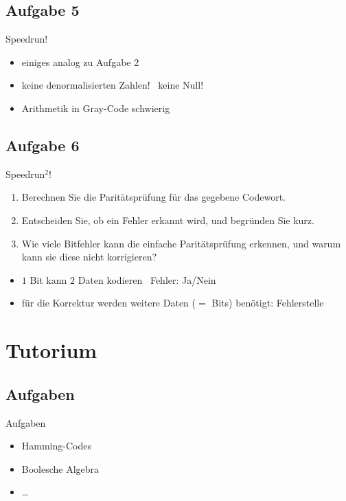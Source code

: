 \documentclass[aspectratio=169,usepdftitle=true,11pt,ngerman,t]{beamer}
\begin{document}
\subsection{Aufgabe 5}
\begin{frame}{Speedrun!}\onslide<+->
    \begin{solve}
        \begin{itemize}[<+->]
            \item einiges analog zu Aufgabe 2
            \item keine denormalisierten Zahlen! \onslide<+->\faAngleRight~keine Null!
            \item Arithmetik in Gray-Code schwierig
        \end{itemize}
    \end{solve}
\end{frame}
\addtocounter{exercise}{1}

\subsection{Aufgabe 6}
\begin{frame}{Speedrun\(^2\)!}\onslide<+->
    \begin{exercise}
        \begin{enumerate}
            \item Berechnen Sie die Paritätsprüfung für das gegebene Codewort.
            \item Entscheiden Sie, ob ein Fehler erkannt wird, und begründen Sie kurz.
            \item Wie viele Bitfehler kann die einfache Paritätsprüfung erkennen, und warum kann sie diese nicht korrigieren?
        \end{enumerate}
    \end{exercise}
    \begin{solve}
        \begin{itemize}[<+->]
            \item \(1\) Bit kann \(2\) Daten kodieren \onslide<+->\faAngleRight~Fehler: Ja/Nein
            \item für die Korrektur werden weitere Daten (\(=\) Bits) benötigt: Fehlerstelle
        \end{itemize}
    \end{solve}
\end{frame}

\section[Aaaaand\dots Time!]{Tutorium}
\subsection{Aufgaben}

\begin{frame}{Aufgaben}
    \begin{itemize}
        \item Hamming-Codes
        \item Boolesche Algebra
        \item \dots
    \end{itemize}
\end{frame}
\end{document}
